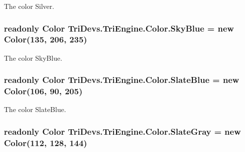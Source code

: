 The color Silver. 

\hypertarget{struct_tri_devs_1_1_tri_engine_1_1_color_a9ae4a5831908291149a4c09784f7df02}{
\subsubsection[{Sky\-Blue}]{\setlength{\rightskip}{0pt plus 5cm}readonly {\bf Color} Tri\-Devs.\-Tri\-Engine.\-Color.\-Sky\-Blue = new {\bf Color}(135, 206, 235)\hspace{0.3cm}{\ttfamily [static]}}}\label{struct_tri_devs_1_1_tri_engine_1_1_color_a9ae4a5831908291149a4c09784f7df02}


The color Sky\-Blue. 

\hypertarget{struct_tri_devs_1_1_tri_engine_1_1_color_a4ce3d60e05af27d36f63bb649b35f450}{
\subsubsection[{Slate\-Blue}]{\setlength{\rightskip}{0pt plus 5cm}readonly {\bf Color} Tri\-Devs.\-Tri\-Engine.\-Color.\-Slate\-Blue = new {\bf Color}(106, 90, 205)\hspace{0.3cm}{\ttfamily [static]}}}\label{struct_tri_devs_1_1_tri_engine_1_1_color_a4ce3d60e05af27d36f63bb649b35f450}


The color Slate\-Blue. 

\hypertarget{struct_tri_devs_1_1_tri_engine_1_1_color_ad3b559bbb73fc42197df506f1da9140f}{
\subsubsection[{Slate\-Gray}]{\setlength{\rightskip}{0pt plus 5cm}readonly {\bf Color} Tri\-Devs.\-Tri\-Engine.\-Color.\-Slate\-Gray = new {\bf Color}(112, 128, 144)\hspace{0.3cm}{\ttfamily [static]}}}\label{struct_tri_devs_1_1_tri_engine_1_1_color_ad3b559bbb73fc42197df506f1da9140f}



